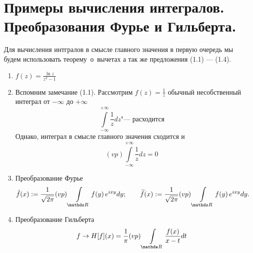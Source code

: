\newpage
\section{Примеры вычисления интегралов. Преобразования Фурье и Гильберта.}
Для вычисления интгралов в смысле главного значения в первую очередь мы будем использовать теорему~о~вычетах а так же предложения (1.1) --- (1.4).

\begin{enumerate} 
\item $f(z) = \frac{\ln{z}}{z^2-1}$
\item Вспомним замечание (1.1).
Рассмотрим $f(z) = \frac{1}{z}$ обычный несобственный интеграл от $-\infty$ до $+\infty$
\[
\int\limits_{-\infty}^{+\infty} \frac{1}{z}dz \text{"--- расходится}
\]
Однако, интеграл в смысле главного значения сходится и
\[
(vp)\int\limits_{-\infty}^{+\infty} \frac{1}{z}dz = 0
\]
\item Преобразование Фурье
\[
  \hat f(x) :=\frac{1}{\sqrt{2 \pi}}(vp)\Gint{\R}f(y)\,e^{ixy}dy;\qquad
  \Til f(x) :=\frac{1}{\sqrt{2 \pi}}(vp)\Gint{\R}f(y)\,e^{ixy}dy.
\]
\item Преобразование Гильберта
\[
f \to H [f](x) = \frac{1}{\pi}(vp)\Gint{\R}\frac{f(x)}{x-t}dt
\]
\end{enumerate}
